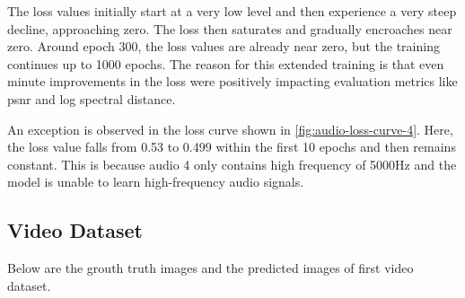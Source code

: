 \documentclass{ioereport}
\begin{document}
    The loss values initially start at a very low level and then experience a very steep decline, approaching zero. The loss then saturates and gradually encroaches near zero. Around epoch 300, the loss values are already near zero, but the training continues up to 1000 epochs. The reason for this extended training is that even minute improvements in the loss were positively impacting evaluation metrics like \gls{psnr} and log spectral distance.

    An exception is observed in the loss curve shown in \autoref{fig:audio-loss-curve-4}. Here, the loss value falls from 0.53 to 0.499 within the first 10 epochs and then remains constant. This is because audio 4 only contains high frequency of 5000Hz and the model is unable to learn high-frequency audio signals.

    \subsection{Video Dataset}
    Below are the grouth truth images and the predicted images of first video dataset.
\end{document}
